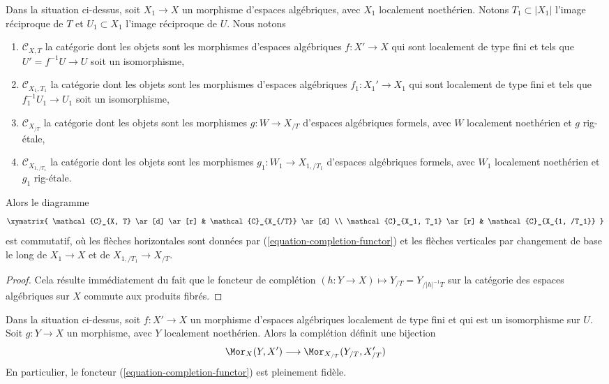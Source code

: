 \begin{lemma}
\label{lemma-functoriality-completion-functor}
Dans la situation ci-dessus, soit $X_1 \to X$ un morphisme d'espaces
algébriques, avec $X_1$ localement noethérien. Notons
$T_1 \subset |X_1|$ l'image réciproque de $T$ et $U_1 \subset X_1$
l'image réciproque de $U$. Nous notons
\begin{enumerate}
\item $\mathcal{C}_{X, T}$ la catégorie dont les objets sont les
morphismes d'espaces algébriques $f : X' \to X$ qui sont localement
de type fini et tels que $U' = f^{-1}U \to U$ soit un isomorphisme,
\item $\mathcal{C}_{X_1, T_1}$ la catégorie dont les objets sont les
morphismes d'espaces algébriques $f_1 : X_1' \to X_1$ qui sont localement
de type fini et tels que $f_1^{-1}U_1 \to U_1$ soit un isomorphisme,
\item $\mathcal{C}_{X_{/T}}$ la catégorie dont les objets sont les
morphismes $g : W \to X_{/T}$ d'espaces algébriques formels,
avec $W$ localement noethérien et $g$ rig-étale,
\item $\mathcal{C}_{X_{1, /T_1}}$ la catégorie dont les objets sont les
morphismes $g_1 : W_1 \to X_{1, /T_1}$ d'espaces algébriques formels,
avec $W_1$ localement noethérien et $g_1$ rig-étale.
\end{enumerate}
Alors le diagramme
$$
\xymatrix{
\mathcal{C}_{X, T} \ar[d] \ar[r] &
\mathcal{C}_{X_{/T}} \ar[d] \\
\mathcal{C}_{X_1, T_1} \ar[r] &
\mathcal{C}_{X_{1, /T_1}}
}
$$
est commutatif, où les flèches horizontales sont données par
(\ref{equation-completion-functor})
et les flèches verticales par changement de base le long de
$X_1 \to X$ et de $X_{1, /T_1} \to X_{/T}$.
\end{lemma}

\begin{proof}
Cela résulte immédiatement du fait que le foncteur de complétion
$(h : Y \to X) \mapsto Y_{/T} = Y_{/|h|^{-1}T}$
sur la catégorie des espaces algébriques sur $X$
commute aux produits fibrés.
\end{proof}

\begin{lemma}
\label{lemma-completion-functor-fully-faithful}
Dans la situation ci-dessus, soit $f : X' \to X$ un morphisme d'espaces
algébriques localement de type fini et qui est un isomorphisme sur $U$.
Soit $g : Y \to X$ un morphisme, avec $Y$ localement noethérien. Alors la
complétion définit une bijection
$$
\Mor_X(Y, X') \longrightarrow \Mor_{X_{/T}}(Y_{/T}, X'_{/T})
$$
En particulier, le foncteur (\ref{equation-completion-functor}) est
pleinement fidèle.
\end{lemma}

